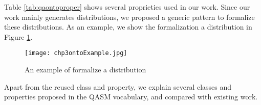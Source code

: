 
Table \ref{tab:qaontoproper} shows several proprieties used in our work. Since our work mainly generates distributions, we proposed a generic pattern to formalize these distributions. As an example, we show the formalization a distribution in Figure \ref{fig:chp3ontoexample}. 

\begin{figure}%
\centering
\texttt{[image: chp3ontoExample.jpg]}  
\caption{An example of formalize a distribution}
\label{fig:chp3ontoexample} 
\end{figure}

Apart from the reused class and property, we explain several classes and properties proposed in the QASM vocabulary, and compared with existing work. 

